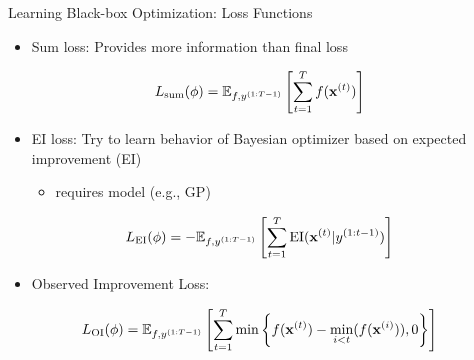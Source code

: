 \begin{frame}[c]{Learning Black-box Optimization: Loss Functions }

\begin{itemize}
\item Sum loss: Provides more information than final loss
\end{itemize}
\begin{equation}
L_{\text{sum}}(\phi) = \mathbb{E}_{f,y^{(1:T-1)}}\left[\sum_{t=1}^T f(\mathbf{x}^{(t)})\right]\nonumber
\end{equation}

\pause

\begin{itemize}
\item EI loss: Try to learn behavior of Bayesian optimizer based on expected improvement (EI)
\begin{itemize}
\item requires model (e.g., GP)
\end{itemize}
\end{itemize}
\begin{equation}
L_{\text{EI}}(\phi) = - \mathbb{E}_{f,y^{(1:T-1)}}\left[\sum_{t=1}^T \text{EI}(\mathbf{x}^{(t)} | y^{(1:t-1)})\right]\nonumber
\end{equation}

\pause

\begin{itemize}
\item Observed Improvement Loss:
\end{itemize}

\begin{equation}
L_{\text{OI}}(\phi) = \mathbb{E}_{f,y^{(1:T-1)}}\left[\sum_{t=1}^T \min \left\{f(\mathbf{x}^{(t)}) - \min_{i<t}(f(\mathbf{x}^{(i)})),0 \right\}  \right]\nonumber
\end{equation}

\end{frame}
